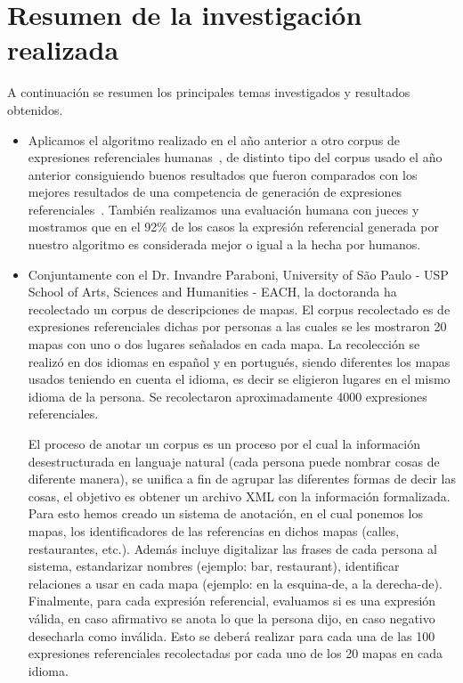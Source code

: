 \section{Resumen de la investigaci\'on realizada}
\label{progreso}

A continuaci\'on se resumen los principales temas investigados y resultados obtenidos. 

\begin{itemize}
\item Aplicamos el algoritmo realizado en el a\~no anterior a otro corpus de expresiones referenciales humanas~\cite{gatt-balz-kow:2008:ENLG}, de distinto tipo del corpus usado el a\~no anterior consiguiendo buenos resultados que fueron comparados con los mejores resultados de una competencia de generaci\'on de expresiones referenciales~\cite{KrahmerGRAPH}. Tambi\'en realizamos una evaluaci\'on humana con jueces y mostramos que en el 92\% de los casos la expresi\'on referencial generada por nuestro algoritmo es considerada mejor o igual a la hecha por humanos.

\item Conjuntamente con el Dr. Invandre Paraboni, University of S\~ao Paulo - USP 
School of Arts, Sciences and Humanities - EACH, la doctoranda ha recolectado un corpus de descripciones de mapas. El corpus recolectado es de expresiones referenciales dichas por personas a las cuales se les mostraron 20 mapas con uno o dos lugares se\~nalados en cada mapa. La recolecci\'on se realiz\'o en dos idiomas en espa\~nol y en portugu\'es, siendo diferentes los mapas usados teniendo en cuenta el idioma, es decir se eligieron lugares en el mismo idioma de la persona. Se recolectaron aproximadamente 4000 expresiones referenciales. 

El proceso de anotar un corpus es un proceso por el cual la informaci\'on desestructurada en languaje natural (cada persona puede nombrar cosas de diferente manera), se unifica a fin de agrupar las diferentes formas de decir las cosas, el objetivo es obtener un archivo XML con la informaci\'on formalizada.
Para esto hemos creado un sistema de anotaci\'on, en el cual ponemos los mapas, los identificadores de las referencias en dichos mapas (calles, restaurantes, etc.). Adem\'as incluye digitalizar las frases de cada persona al sistema, estandarizar nombres (ejemplo: bar, restaurant), identificar relaciones a usar en cada mapa (ejemplo: en la esquina-de, a la derecha-de). Finalmente, para cada expresi\'on referencial, evaluamos si es una expresi\'on v\'alida, en caso afirmativo se anota lo que la persona dijo, en caso negativo desecharla como inv\'alida. Esto se deber\'a realizar para cada una de las 100 expresiones referenciales recolectadas por cada uno de los 20 mapas en cada idioma.
 

\end{itemize}

